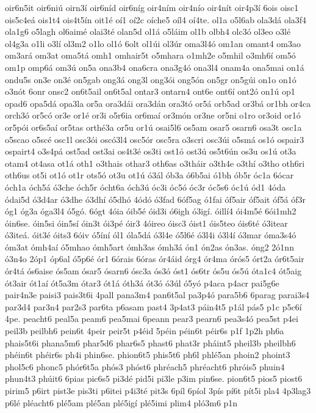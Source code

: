 {oir6n5it
oir6niú
oirn3í
oir6níd
oir6níg
oir4ním
oir4nío
oir4nít
oir4p3í
6ois
oisc1
ois5c4eá
ois1t4
ois4t5ín
oit1é
oí1
oí2c
oíche5
oíl4
oí4te.
ol1a
o5l6ab
ola3dá
ola3f4
ola1g6
o5lagh
ol6aimé
olai3té
olan5d
ol1á
o5láim
ol1b
olbh4
olc3ó
ol3eo
o3lé
ol4g3a
o1li
o3lí
ol3m2
o1lo
ol1ó
6olt
ol1úi
ol3úr
oma3l4ó
om1an
omant4
om3ao
om3ará
om3at
oma5tá
omh1
omhair5t
o5mhara
o1mh2e
o5mhil
o3mh6í
om5ó
om1p
omp6á
om3ú
on5a
ona3b4
ona6cra
ona3g4ó
ona3l4
onam4a
ona5mai
on1á
ondu5s
on3e
on3é
on5gab
ong3á
ong3l
ong3ói
ong5ón
on5gr
on5gúi
on1o
on1ó
o3nót
6onr
onsc2
on6t5ail
on6t5al
ontar3
ontarn4
ont6e
ont6í
ont2ó
on1ú
op1
opad6
opa5dá
opa3la
or5a
ora3dái
ora3dán
ora3tó
or5á
orb5ad
or3bá
or1bh
or4ca
orch3ó
or5có
or3e
or1é
or3i
o5r6ia
or6maí
or3món
or3ne
or5ni
o1ro
or3oid
or1ó
or5pói
or6s5aí
or5tas
orthé3a
or5u
or1ú
osai5l6
os5am
osar5
osarn6
osa3t
osc1a
o5scao
o5scé
osc1l
osc3ói
oscó3l4
osc5ór
osc5ra
o3scri
osc3úi
o5smá
os1ó
ospair3
ospairt4
o3s4pá
ost5ad
ost3ai
os4t3é
os3ti
ost1ó
ost3ú
os5t6ún
os3u
os1ú
ot3a
otam4
ot4asa
ot1á
oth1
o3thais
othar3
oth6as
o3tháir
o3th4e
o3thí
o3tho
oth6ri
oth6us
ot5i
ot1ó
ot1r
ots5ó
ot3u
ot1ú
ó3ál
ób3a
ó6b5ai
ó1bh
ób5r
óc1a
6ócar
óch1a
óch5á
ó3che
óch5r
ócht6a
óch3ú
óc3i
óc5ó
óc3r
óc5s6
óc1ú
ód1
4óda
ódai5d
ó3d4ar
ó3dhe
ó3dhí
ó5dhó
4ódó
ó3fad
6óf5ag
ó1fai
óf5air
óf5ait
óf5á
óf3r
óg1
óg3a
óga3l4
ó5gó.
6ógt
4óia
óib5é
óid3i
ó6igh
ó3igí.
óillí4
ói4m5é
6ói1mh2
óin6se.
óin5si
óin5sí
óin3t
ói3pé
óir3
4óireo
óisc3
óist1
óis5teo
óis6té
ó3itear
ó3iteá.
óit3é
óits3
6óiv
ó5íní
ól1
óla5dá
ó3l4e
ó5l6é
ó3l4i
ó3l4í
ó3mar
óma3s4ó
óm3at
ómh4aí
ó5mhao
ómh5art
ómh3as
ómh3á
ón1
ón2as
ón3as.
óng2
2ó1nn
ó3n4o
2óp1
óp6al
ó5p6é
ór1
6órais
6óras
ór4áid
órg4
ór4ma
órós5
órt2a
ór6t5air
ór4tá
ós6aise
ós5am
ósar5
ósarn6
ósc3a
ós3ó
óst1
ós6tr
ós5u
ós5ú
óta1c4
ót5aig
ót3air
ót1aí
ót5a3m
ótar3
ót1á
óth3á
ót3ó
ó3úl
ó5yó
p4aca
p4acr
pai5g6e
pair4n3e
paisi3
pais3t6i
4pall
pana3m4
pan6t5al
pa3p4ó
para5b6
6parag
parai3s4
par3d4
par3n4
par2s3
par6ta
p6asam
past4
3p4at3
páin4t5
p1ál
pás5
p1c
p5c6í
4pe.
peacht6
peal5a
peam6
pea5mai
6peann
pear3
pearn6
pea3s4ó
pea5st
p4ei
peil3b
peilbh6
pein6t
4peir
peir5t
p4éid
5péin
péin6t
péir6s
p1f
1p2h
ph6a
phais5t6i
phana5m6
phar5d6
phar6s5
phast6
phat3r
pháint5
pheil3b
pheilbh6
phéin6t
phéir6s
ph4i
phin6se.
phion6t5
phis5t6
ph6l
phlé5an
phoin2
phoint3
phol5c6
phonc5
phór6t5a
phós3
phóst6
phréach5
phréacht6
phróis5
phuin4
phun4t3
phúit6
6pias
pic6s5
pi3dé
pid5i
pi3le
p3im
pin6se.
pion6t5
pios5
piost6
pirim5
p6irt
pist3e
pis3ti
p6itei
p4i3té
pit3s
6píl
6píol
3pís
pí6t
pít5i
pla4
4p3lag3
p6lé
pléacht6
plé5am
plé5an
plé5igí
plé5imi
plim4
pló3m6
p1n
}
